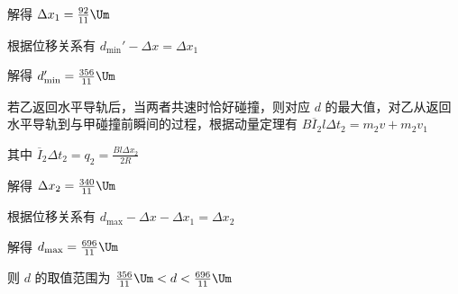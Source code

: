 \documentclass[\gkver]{gaokaozhenti}
\begin{document}
\begin{enumerate}
{解得 $\Delta x_{1} = \frac{92}{11} \Um$

根据位移关系有
$d_{\min}' - \Delta x = \Delta x_{1}$

解得 $d_{\min}' = \frac{356}{11} \Um$

若乙返回水平导轨后，当两者共速时恰好碰撞，则对应 $d$ 的最大值，对乙从返回水平导轨到与甲碰撞前瞬间的过程，根据动量定理有
$B\overline{I}_{2}l\Delta t_{2} = m_{2}v + m_{2}v_{1}$

其中 $\overline{I}_{2}\Delta t_{2} = q_{2} = \frac{Bl\Delta x_{2}}{2R}$

解得 $\Delta x_{2} = \frac{340}{11} \Um$

根据位移关系有 $d_{\max} - \Delta x - \Delta x_{1} = \Delta x_{2}$

解得 $d_{\max} = \frac{696}{11} \Um$

则 $d$ 的取值范围为 $\frac{356}{11} \Um < d < \frac{696}{11} \Um$
}

\end{enumerate}
\end{document}
